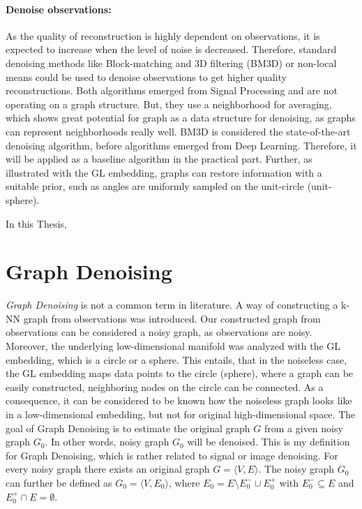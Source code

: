   \paragraph{Denoise observations:}
  As the quality of reconstruction is highly dependent on observations, it
  is expected to increase when the level of noise is decreased.
  Therefore, standard denoising methods like Block-matching and 3D filtering (BM3D) \cite{bm3d} or 
  non-local means \cite{noneLocalMean} could be used to denoise observations to get higher quality reconstructions.
  Both algorithms emerged from Signal Processing and are not operating on a graph structure. 
  But, they use a neighborhood for averaging, which shows great potential for graph 
  as a data structure for denoising, as graphs can represent neighborhoods really well.
  BM3D is considered the state-of-the-art denoising algorithm, before algorithms emerged from Deep Learning.
  Therefore, it will be applied as a baseline algorithm in the practical part.
  Further, as illustrated with the GL embedding, graphs can restore information with a suitable prior,
  such as angles are uniformly sampled on the unit-circle (unit-sphere). 

  In this Thesis, 

\section{Graph Denoising}
\textit{Graph Denoising} is not a common term in literature.
A way of constructing a k-NN graph from observations was introduced.
Our constructed graph from observations can be considered a noisy graph, as observations are noisy. 
Moreover, the underlying low-dimensional manifold was analyzed with the GL embedding, which is a circle or a sphere.
This entails, that in the noiseless case, the GL embedding maps data points to the circle (sphere), 
where a graph can be easily constructed, neighboring nodes on the circle can be connected.
As a consequence, it can be considered to be known how the noiseless graph looks like in
a low-dimensional embedding, but not for original high-dimensional space. 
The goal of Graph Denoising is to estimate the original graph $G$ from a given noisy graph $G_0$.
In other words, noisy graph $G_0$ will be denoised.
This is my definition for Graph Denoising, which is rather related to signal or image denoising.
For every noisy graph there exists an original graph $G = \langle V,E \rangle$.
The noisy graph $G_0$ can further be defined as $G_0 = \langle V, E_0 \rangle$,  
 where $E_0 = E \setminus  E^{-}_0 \cup  E^{+}_0$ with $E^{-}_0 \subseteq E$ and $E^{+}_0 \cap E = \emptyset$.

